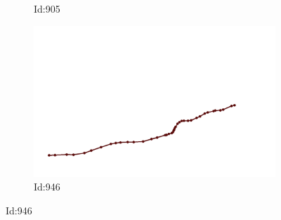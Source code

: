 \documentclass[12pt,twoside]{report}
\begin{document}
\begin{figure}
\begin{subfigure}[b]{0.20\textwidth}
\caption{Id:905}
\end{subfigure}
\begin{subfigure}[b]{0.20\textwidth}
\centering
\includegraphics[width=\textwidth]{../trajectories/946.png}
\caption{Id:946}
\end{subfigure}
\end{figure}
\end{document}
